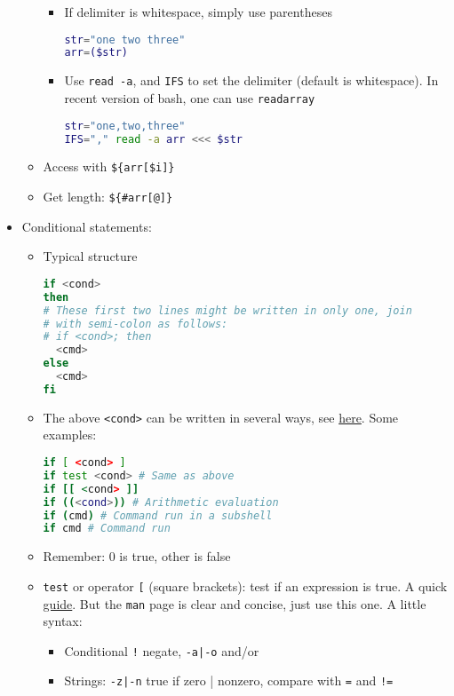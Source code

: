 \documentclass[a4paper,12pt,%
              final%
              ]{article}
\begin{document}
\begin{itemize}
\begin{itemize}
\begin{itemize}
          \item If delimiter is whitespace, simply use parentheses
\begin{lstlisting}[language=bash]
str="one two three"
arr=($str)
\end{lstlisting}
          \item Use \verb|read -a|, and \verb|IFS| to set the delimiter (default is whitespace). In recent version of bash, one can use \verb|readarray|
\begin{lstlisting}[language=bash]
str="one,two,three"
IFS="," read -a arr <<< $str
\end{lstlisting}
        \end{itemize}
      \item Access with \verb|${arr[$i]}|
      \item Get length: \verb|${#arr[@]}|
    \end{itemize}
  \item Conditional statements:
    \begin{itemize}
      \item Typical structure
\begin{lstlisting}[language=bash]
if <cond>
then
# These first two lines might be written in only one, join
# with semi-colon as follows:
# if <cond>; then
  <cmd>
else
  <cmd>
fi
\end{lstlisting}
      \item The above \verb|<cond>| can be written in several ways, see \href{https://unix.stackexchange.com/questions/306111/what-is-the-difference-between-the-bash-operators-vs-vs-vs}{here}. Some examples:
\begin{lstlisting}[language=bash]
if [ <cond> ]
if test <cond> # Same as above
if [[ <cond> ]]
if ((<cond>)) # Arithmetic evaluation
if (cmd) # Command run in a subshell
if cmd # Command run
\end{lstlisting}
      \item Remember: 0 is true, other is false
      \item \texttt{test} or operator \verb|[| (square brackets): test if an expression is true. A quick \href{https://www.computerhope.com/unix/test.htm}{guide}. But the \texttt{man} page is clear and concise, just use this one. A little syntax:
        \begin{itemize}
          \item Conditional \verb|!| negate, \verb!-a|-o! and/or
          \item Strings: \verb!-z|-n! true if zero | nonzero, compare with \verb|=| and \verb|!=|

\end{itemize}
\end{itemize}
\end{itemize}
\end{document}
